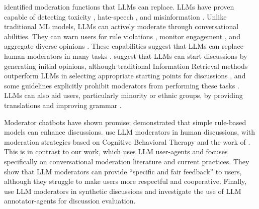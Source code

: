 \citet{korre2025evaluation} identified moderation functions that \acp{LLM} can replace. \acp{LLM} have proven capable of detecting toxicity \cite{kang-qian-2024-implanting, Wang2022ToxicityDW}, hate-speech \cite{Nirmal2024TowardsIH, shi-2024-hatespeech}, and misinformation \cite{Liu2024DetectIJ, Xu2024ACS}. Unlike traditional \ac{ML} models, \acp{LLM} can actively moderate through conversational abilities. They can warn users for rule violations \cite{Kumar_AbuHashem_Durumeric_2024}, monitor engagement \cite{schroeder-etal-2024-fora}, and aggregate diverse opinions \cite{small-polis-llm}. These capabilities suggest that \acp{LLM} can replace human moderators in many tasks \cite{small-polis-llm, seering_self_moderation}. \citet{small-polis-llm} suggest that \acp{LLM} can start discussions by generating initial opinions, although traditional Information Retrieval methods outperform \acp{LLM} in selecting appropriate starting points for discussions \cite{karadzhov2023delidata}, and some guidelines explicitly prohibit moderators from performing these tasks \cite{dimitra-book}. \acp{LLM} can also aid users, particularly minority or ethnic groups, by providing translations and improving grammar \cite{Tsai2024Generative}. 

Moderator chatbots have shown promise; \citet{kim_et_al_chatbot} demonstrated that simple rule-based models can enhance discussions. \citet{cho-etal-2024-language} use \ac{LLM} moderators in human discussions, with moderation strategies based on Cognitive Behavioral Therapy and the work of \citet{rosenberg2015nonviolent}. This is in contrast to our work, which uses \ac{LLM} user-agents and focuses specifically on conversational moderation literature and current practices. They show that \ac{LLM} moderators can provide “specific and fair feedback” to users, although they struggle to make users more respectful and cooperative. Finally, \citet{dtsirmpas_thesis} use \ac{LLM} moderators in synthetic discussions and investigate the use of \ac{LLM} annotator-agents for discussion evaluation.